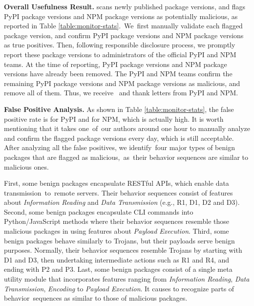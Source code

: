 
\textbf{Overall Usefulness Result.}  \tool scans  newly published package versions, and flags  PyPI package versions and  NPM package versions as potentially malicious, as reported in Table \ref{table:monitor-stats}.~We~first manually validate each flagged package version, and confirm  PyPI package versions and  NPM package versions as true positives. Then, following responsible disclosure process, we promptly report these package versions to administrators of the official PyPI and NPM teams. At the time of reporting,  PyPI package versions and  NPM package versions have already been removed. The PyPI and NPM teams confirm the remaining  PyPI package versions and  NPM package versions as malicious, and remove all of them. Thus, we receive~ and  thank letters from PyPI and NPM.


\textbf{False Positive Analysis.} As shown in Table \ref{table:monitor-stats}, the false positive rate is  for PyPI and  for NPM, which is actually high. It is worth mentioning that it takes one~of~our authors around one hour to manually analyze and confirm the flagged package versions every day, which is still acceptable. After analyzing all the false positives, we identify~four major types of benign packages that are flagged as malicious,~as~their behavior sequences are similar to malicious ones. 

First, some benign packages encapsulate RESTful APIs, which enable data transmission~to~remote servers. Their behavior sequences consist of features about \textit{Information Reading} and \textit{Data Transmission} (e.g., R1, D1, D2 and D3). Second, some benign packages encapsulate CLI commands into Python/JavaScript methods where their behavior sequences resemble those malicious packages in using features about \textit{Payload Execution}. Third, some benign packages behave similarly to Trojans, but their payloads serve benign purposes. Normally, their behavior sequences resemble Trojans by starting with D1 and D3, then undertaking intermediate actions such as R1 and R4, and ending with P2 and P3. Last, some benign packages consist of a single meta utility module that incorporates features ranging from \textit{Information Reading}, \textit{Data Transmission}, \textit{Encoding} to \textit{Payload Execution}. It causes \tool to recognize parts of behavior~sequences as similar to those of malicious packages.


